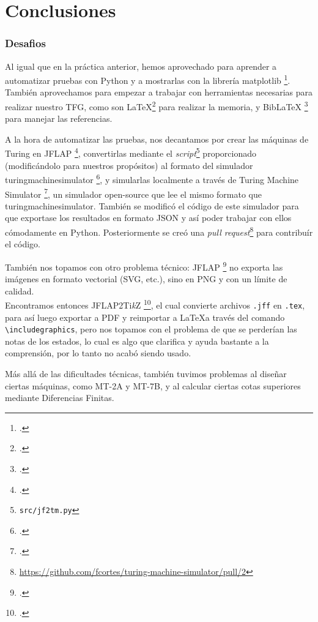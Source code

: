 \part{Conclusiones}

\section{Desafios}
Al igual que en la práctica anterior, hemos aprovechado para aprender a automatizar pruebas con Python y a mostrarlas con la librería matplotlib \footcite[ver][]{matplotlib}. También aprovechamos para empezar a trabajar con herramientas necesarias para realizar nuestro TFG, como son \LaTeX \footcite[ver][]{latex} para realizar la memoria, y BibLaTeX \footcite[ver][]{biblatex} para manejar las referencias.\medskip

A la hora de automatizar las pruebas, nos decantamos por crear las máquinas de Turing en JFLAP \footcite[ver][]{jflap}, convertirlas mediante el \textit{script}\footnote{\texttt{src/jf2tm.py}} proporcionado (modificándolo para nuestros propósitos) al formato del simulador turingmachinesimulator \footcite[ver][]{turingmachinesimulator}, y simularlas localmente a través de Turing Machine Simulator \footcite[ver][]{tmsimulator}, un simulador open-source que lee el mismo formato que turingmachinesimulator. También se modificó el código de este simulador para que exportase los resultados en formato JSON y así poder trabajar con ellos cómodamente en Python. Posteriormente se creó una \textit{pull request}\footnote{\url{https://github.com/fcortes/turing-machine-simulator/pull/2}} para contribuír el código.\medskip

También nos topamos con otro problema técnico: JFLAP \footcite[ver][]{jflap} no exporta las imágenes en formato vectorial (SVG, etc.), sino en PNG y con un límite de calidad.\\
Encontramos entonces JFLAP2Ti\textit{k}Z \footcite[ver][]{jflap2tikz}, el cual convierte archivos \texttt{.jff} en \texttt{.tex}, para así luego exportar a PDF y reimportar a \LaTeX a través del comando \verb|\includegraphics|, pero nos topamos con el problema de que se perderían las notas de los estados, lo cual es algo que clarifica y ayuda bastante a la comprensión, por lo tanto no acabó siendo usado.\medbreak

Más allá de las dificultades técnicas, también tuvimos problemas al diseñar ciertas máquinas, como MT-2A y MT-7B, y al calcular ciertas cotas superiores mediante Diferencias Finitas.


